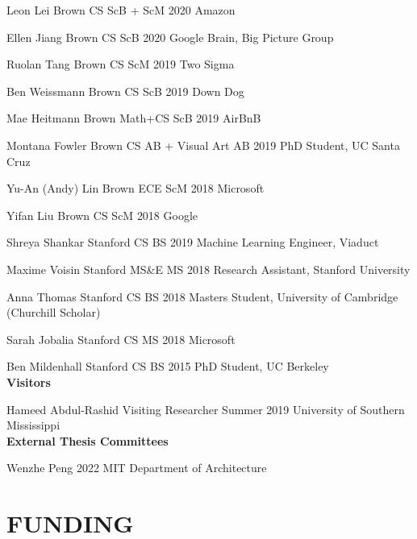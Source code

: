 \documentclass[line,margin]{res}
\begin{document}
\begin{resume}
\alumni
{Leon Lei}
{Brown CS ScB + ScM}
{2020}
{Amazon}

\alumni
{Ellen Jiang}
{Brown CS ScB}
{2020}
{Google Brain, Big Picture Group}


\alumni
{Ruolan Tang}
{Brown CS ScM}
{2019}
{Two Sigma}

\alumni
{Ben Weissmann}
{Brown CS ScB}
{2019}
{Down Dog}

\alumni
{Mae Heitmann}
{Brown Math+CS ScB}
{2019}
{AirBnB}

\alumni
{Montana Fowler}
{Brown CS AB + Visual Art AB}
{2019}
{PhD Student, UC Santa Cruz}

\alumni
{Yu-An (Andy) Lin}
{Brown ECE ScM}
{2018}
{Microsoft}

\alumni
{Yifan Liu}
{Brown CS ScM}
{2018}
{Google}

\alumni
{Shreya Shankar}
{Stanford CS BS}
{2019}
{Machine Learning Engineer, Viaduct}

\alumni
{Maxime Voisin}
{Stanford MS\&E MS}
{2018}
{Research Assistant, Stanford University}

\alumni
{Anna Thomas}
{Stanford CS BS}
{2018}
{Masters Student, University of Cambridge (Churchill Scholar)}

\alumni
{Sarah Jobalia}
{Stanford CS MS}
{2018}
{Microsoft}

\alumni
{Ben Mildenhall}
{Stanford CS BS}
{2015}
{PhD Student, UC Berkeley}
\\


\textbf{Visitors}

\visitor
{Hameed Abdul-Rashid}
{Visiting Researcher}
{Summer 2019}
{University of Southern Mississippi}
\\


\textbf{External Thesis Committees}

\thesiscomm
{Wenzhe Peng}
{2022}
{MIT Department of Architecture}


\section{FUNDING}

\newcommand{\funding}[5] {
	\textbf{#1} \hfill #5\\
	#2 \\
	#3. #4
}


\end{resume}
\end{document}
